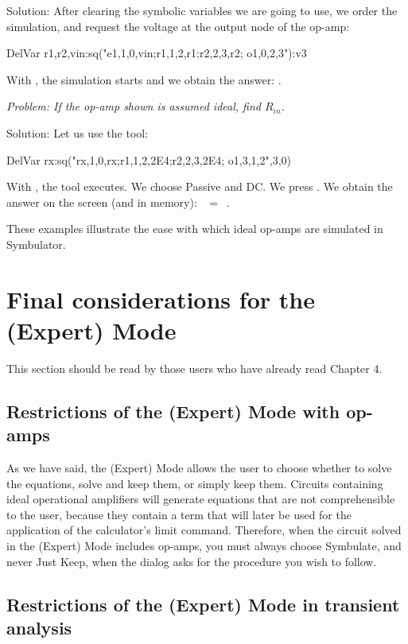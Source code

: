 Solution: After clearing the symbolic variables we are going to use,
we order the simulation, and request the voltage at the output node
of the op-amp:

\begin{entry}
DelVar r1,r2,vin:sq\dc("e1,1,0,vin;r1,1,2,r1;r2,2,3,r2;
o1,0,2,3"):v3
\end{entry}

With , the simulation starts and we obtain the answer:
.


\emph{Problem: If the op-amp shown is assumed ideal, find
$R_{in}$.}

Solution: Let us use the  tool:

\begin{entry}
DelVar rx:sq\thevenin("rx,1,0,rx;r1,1,2,2E4;r2,2,3,2E4;
o1,3,1,2",3,0)
\end{entry}

With , the tool executes. We choose Passive and DC. We
press . We obtain the answer on the screen (and in
memory): ~$=$~.

These examples illustrate the ease with which ideal op-amps are
simulated in Symbulator.

\section{Final considerations for the (Expert) Mode}

This section should be read by those users who have already read
Chapter 4.

\subsection{Restrictions of the (Expert) Mode with op-amps}

As we have said, the (Expert) Mode allows the user to choose whether
to solve the equations, solve and keep them, or simply keep them.
Circuits containing ideal operational amplifiers will generate
equations that are not comprehensible to the user, because they
contain a term that will later be used for the application of the
calculator's limit command. Therefore, when the circuit solved in
the (Expert) Mode includes op-amps, you must always choose
Symbulate, and never Just Keep, when the dialog asks for the
procedure you wish to follow.

\subsection{Restrictions of the (Expert) Mode in transient
analysis}

